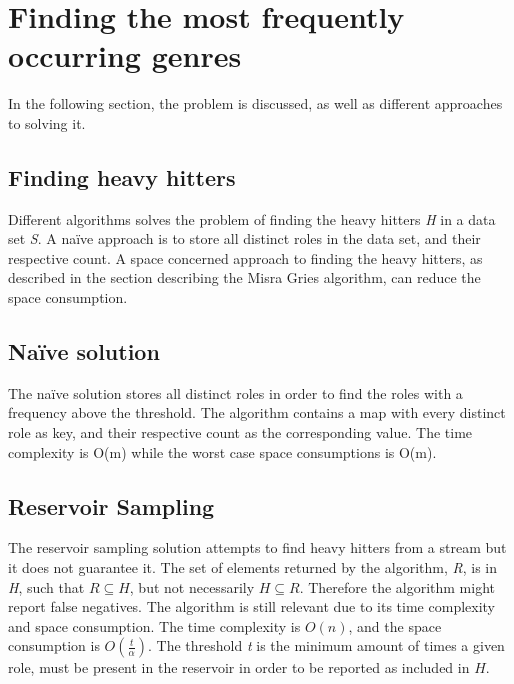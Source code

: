 \section{Finding the most frequently occurring genres}
In the following section, the problem is discussed, as well as different approaches to solving it.

\subsection{Finding heavy hitters}
Different algorithms solves the problem of finding the heavy hitters \textit{H} in a data set \textit{S}. A naïve approach is to store all distinct roles in the data set, and their respective count. A space concerned approach to finding the heavy hitters, as described in the section describing the Misra Gries algorithm, can reduce the space consumption.

\subsection{Naïve solution}
The naïve solution stores all distinct roles in order to find the roles with a frequency above the threshold. The algorithm contains a map with every distinct role as key, and their respective count as the corresponding value. The time complexity is O(m) while the worst case space consumptions is O(m).

\subsection{Reservoir Sampling}
The reservoir sampling solution attempts to find heavy hitters from a stream but it does not guarantee it. The set of elements returned by the algorithm, \textit{R}, is in \textit{H}, such that
\begin{math}
	R \subseteq H
\end{math}, but not necessarily 
\begin{math}
	H \subseteq R
\end{math}. Therefore the algorithm might report false negatives.
The algorithm is still relevant due to its time complexity and space consumption. The time complexity is \(O(n)\), and the space consumption is \(O(\frac{t}{\alpha})\). The threshold \textit{t} is the minimum amount of times a given role, must be present in the reservoir in order to be reported as included in \(H\). \\

